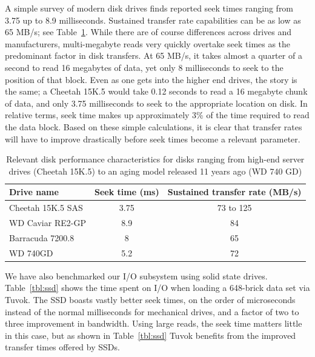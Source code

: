 A simple survey of modern disk drives finds reported seek
times ranging from 3.75 up to 8.9 milliseconds. Sustained
transfer rate capabilities can be as low as 65 MB/s; see
Table~\ref{tbl:disks}.  While there are of course differences across
drives and manufacturers, multi-megabyte reads very quickly overtake
seek times as the predominant factor in disk transfers. At 65 MB/s,
it takes almost a quarter of a second to read 16 megabytes of data,
yet only 8 milliseconds to seek to the position of that block. Even as
one gets into the higher end drives, the story is the same; a Cheetah
15K.5 would take 0.12 seconds to read a 16 megabyte chunk of data, and
only 3.75 milliseconds to seek to the appropriate location on disk.
In relative terms, seek time makes up approximately 3\% of the time
required to read the data block. Based on these simple calculations, it
is clear that transfer rates will have to improve drastically before
seek times become a relevant parameter.

\begin{table}
	\begin{center}
	\begin{tabular}{l|cc}
	\textbf{Drive name} & \textbf{Seek time (ms)} &
		\textbf{Sustained transfer rate (MB/s)}\\\hline
	Cheetah 15K.5 SAS & 3.75 & 73 to 125\\
	WD Caviar RE2-GP & 8.9 & 84\\
	Barracuda 7200.8 & 8 & 65\\
	WD 740GD & 5.2 & 72\\
	\end{tabular}
	\end{center}

  \caption{Relevant disk performance characteristics for disks ranging
  from high-end server drives (Cheetah 15K.5) to an aging model
  released 11 years ago (WD 740 GD)}
	\label{tbl:disks}
\end{table}

We have also benchmarked our I/O subsystem using solid
state drives. Table~\ref{tbl:ssd} shows the time spent on I/O when
loading a 648-brick data set via Tuvok. The SSD boasts vastly better
seek times, on the order of microseconds instead of the normal
milliseconds for mechanical drives, and a factor of two to three
improvement in bandwidth. Using large reads, the seek time matters
little in this case, but as shown in Table~\ref{tbl:ssd} Tuvok benefits
from the improved transfer times offered by SSDs.

